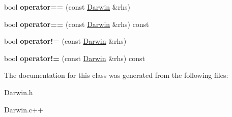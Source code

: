 \begin{DoxyCompactItemize}
\item 
\hypertarget{class_darwin_a00a897bb9f15e7b041a39b05efc58ac5}{bool {\bfseries operator==} (const \hyperlink{class_darwin}{Darwin} \&rhs)}\label{class_darwin_a00a897bb9f15e7b041a39b05efc58ac5}

\item 
\hypertarget{class_darwin_adab55c4ce90836425a1a40ecdc8a527f}{bool {\bfseries operator==} (const \hyperlink{class_darwin}{Darwin} \&rhs) const }\label{class_darwin_adab55c4ce90836425a1a40ecdc8a527f}

\item 
\hypertarget{class_darwin_a4b717b1896eeeb325aeb816c4bbc4519}{bool {\bfseries operator!=} (const \hyperlink{class_darwin}{Darwin} \&rhs)}\label{class_darwin_a4b717b1896eeeb325aeb816c4bbc4519}

\item 
\hypertarget{class_darwin_a0a81455cd57602e7cd14c288f35237b5}{bool {\bfseries operator!=} (const \hyperlink{class_darwin}{Darwin} \&rhs) const }\label{class_darwin_a0a81455cd57602e7cd14c288f35237b5}

\end{DoxyCompactItemize}


The documentation for this class was generated from the following files\-:\begin{DoxyCompactItemize}
\item 
Darwin.\-h\item 
Darwin.\-c++\end{DoxyCompactItemize}
